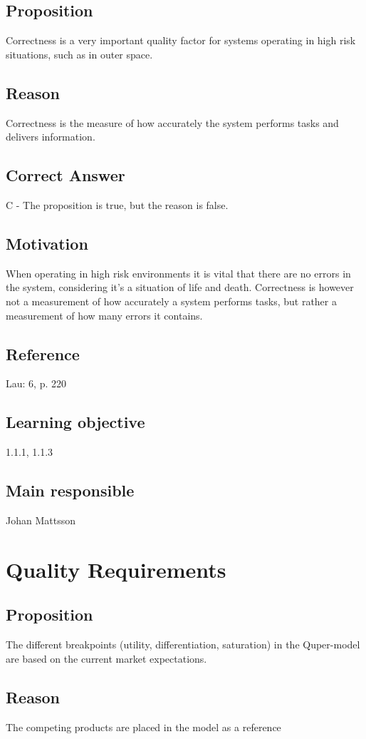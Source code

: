 \documentclass[a4paper]{article}
\begin{document}
\subsection*{Proposition}
Correctness is a very important quality factor for systems operating in high risk situations, such as in outer space.
\subsection*{Reason}
Correctness is the measure of how accurately the system performs tasks and delivers information.
\subsection*{Correct Answer}
C - The proposition is true, but the reason is false.
\subsection*{Motivation}
When operating in high risk environments it is vital that there are no errors in the system, considering it’s a situation of life and death. Correctness is however not a measurement of how accurately a system performs tasks, but rather a measurement of how many errors it contains.
\subsection*{Reference}
Lau: 6, p. 220
\subsection*{Learning objective}
1.1.1, 1.1.3
\subsection*{Main responsible}
Johan Mattsson

\section{Quality Requirements}
\subsection*{Proposition}
The different breakpoints (utility, differentiation, saturation) in the Quper-model are based on the current market expectations.
\subsection*{Reason}
The competing products are placed in the model as a reference
\end{document}

